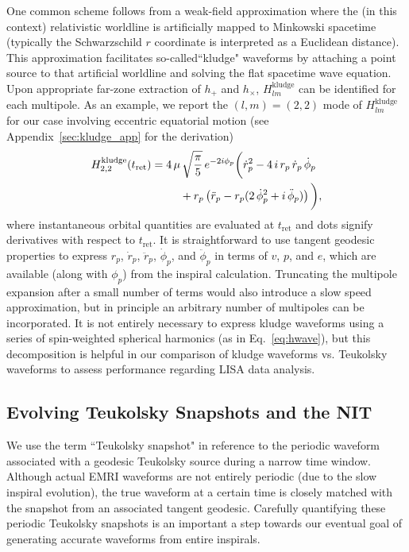 \documentclass[aps,prd,twocolumn,showpacs,notitlepage,eqsecnum,
superscriptaddress,nofootinbib]{revtex4-1}
\begin{document}
One common scheme follows from a weak-field approximation where the (in this context) relativistic worldline is artificially mapped to Minkowski spacetime (typically the Schwarzschild $r$ coordinate is interpreted as a Euclidean distance). This approximation facilitates so-called``kludge" waveforms by attaching a point source to that artificial worldline and solving the flat spacetime wave equation. Upon appropriate far-zone extraction of $h_+$ and $h_\times$, $H_{lm}^\text{kludge}$ can be identified for each multipole. As an example, we report the $(l,m)=(2,2)$ mode of $H_{lm}^\text{kludge}$ for our case involving eccentric equatorial motion (see Appendix~\ref{sec:kludge_app} for the derivation)
\begin{align}
&H_{2,2}^\text{kludge}(t_\text{ret}) = 4\,\mu\,\sqrt{\frac{\pi}{5}} \,e^{-2i\phi_p} \bigg(\dot{r}_p^2-4\,i\,r_p\,\dot{r}_p\,\dot{\phi}_p \notag
\\&\qquad\qquad\qquad\qquad +r_p\left( \ddot{r}_p-r_p(2\,\dot{\phi}_p^2+i\,\ddot{\phi}_p) \right) \bigg) ,
\label{eq:kludge}
\end{align}
where instantaneous orbital quantities are evaluated at $t_\text{ret}$ and dots signify derivatives with respect to $t_\text{ret}$. It is straightforward to use tangent geodesic properties to express $r_p$, $\dot{r}_p$, $\ddot{r}_p$, $\dot{\phi}_p$, and $\ddot{\phi}_p$ in terms of $v$, $p$, and $e$, which are available (along with $\phi_p$) from the inspiral calculation. Truncating the multipole expansion after a small number of terms would also introduce a slow speed approximation, but in principle an arbitrary number of multipoles can be incorporated. It is not entirely necessary to express kludge waveforms using a series of spin-weighted spherical harmonics (as in Eq.~\eqref{eq:hwave}), but this decomposition is helpful in our comparison of kludge waveforms vs. Teukolsky waveforms to assess performance regarding LISA data analysis.

\subsection{Evolving Teukolsky Snapshots and the NIT}
\label{sec:TeukWave}

We use the term ``Teukolsky snapshot" in reference to the periodic waveform associated with a geodesic Teukolsky source during a narrow time window. Although actual EMRI waveforms are not entirely periodic (due to the slow inspiral evolution), the true waveform at a certain time is closely matched with the snapshot from an associated tangent geodesic. Carefully quantifying these periodic Teukolsky snapshots is an important a step towards our eventual goal of generating accurate waveforms from entire inspirals. 
\end{document}
